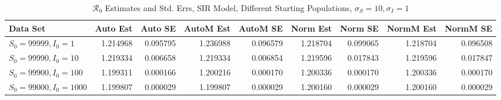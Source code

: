 \documentclass[12pt]{article}
\newcommand{\rr}{\ensuremath{\mathcal{R}_0}}
\begin{document}
\begin{table}[H]
	
	\caption{$\rr$ Estimates and Std. Errs, SIR Model,
		Different Starting Populations, 
		$\sigma_S = 10, \sigma_I = 1$}
	\begin{footnotesize}
		\hskip -1.7cm
	\begin{tabular}{l|r|r|r|r|r|r|r|r}
		\hline
		Data Set & Auto Est & Auto SE & AutoM Est & AutoM SE & Norm Est & Norm SE & NormM Est & NormM SE\\
		\hline
		$S_0 = 99999, I_0 = 1$ & 1.214968 & 0.095795 & 1.236988 & 0.096579 & 1.218704 & 0.099065 & 1.218704 & 0.096508\\
		\hline
		$S_0 = 99990, I_0 = 10$ & 1.219334 & 0.006658 & 1.219334 & 0.006854 & 1.219596 & 0.017843 & 1.219596 & 0.017847\\
		\hline
		$S_0 = 99900, I_0 = 100$ & 1.199311 & 0.000166 & 1.200216 & 0.000170 & 1.200336 & 0.000170 & 1.200336 & 0.000170\\
		\hline
		$S_0 = 99000, I_0 = 1000$ & 1.199807 & 0.000029 & 1.199807 & 0.000029 & 1.200160 & 0.000029 & 1.200160 & 0.000029\\
		\hline
	\end{tabular}
\end{footnotesize}
\end{table}
\end{document}
